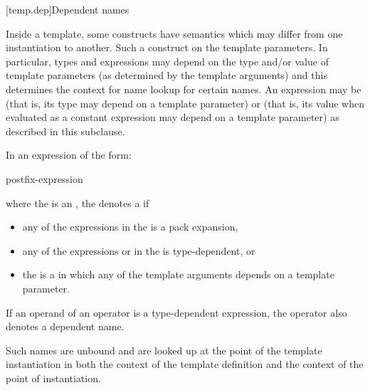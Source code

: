 [temp.dep]{Dependent names}

\pnum
{}%
Inside a template, some constructs have semantics which may differ from one
instantiation to another.
Such a construct
on the template parameters.
In particular, types and expressions may depend on the type
and/or
value of
template parameters (as determined by the template arguments) and this determines
the context for name lookup for certain names.
An expression may be
(that is, its type may depend on a template parameter) or
(that is, its value when evaluated as a constant expression
may depend on a template parameter)
as described in this subclause.

\pnum
In an expression of the form:

\begin{ncsimplebnf}
postfix-expression \terminal{(}  \terminal{)}
\end{ncsimplebnf}

where the
is an
,
the
denotes a
if

\begin{itemize}
\item
any of the expressions in the  is a pack
expansion,

\item
any of the expressions
or 
in the
is type-dependent, or

\item
the 
is a  in which any of the template arguments depends
on a template parameter.
\end{itemize}

If an operand of an operator is a type-dependent expression, the operator
also denotes a dependent name.
\begin{note}
Such names are unbound and
are looked up at the point of the template instantiation in
both the context of the template definition and the
context of the point of instantiation.
\end{note}

